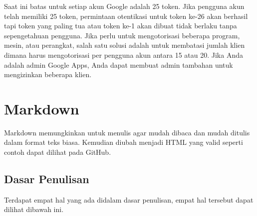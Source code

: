 Saat ini batas untuk setiap akun Google adalah 25 token. Jika pengguna akun telah memiliki 25 token, permintaan otentikasi untuk token ke-26 akan berhasil tapi token yang paling tua atau token ke-1 akan dibuat tidak berlaku tanpa sepengetahuan pengguna.
Jika perlu untuk mengotorisasi beberapa program, mesin, atau perangkat, salah satu solusi adalah untuk membatasi jumlah klien dimana harus mengotorisasi per pengguna akun antara 15 atau 20. Jika Anda adalah admin Google Apps, Anda dapat membuat admin tambahan untuk mengizinkan beberapa klien.

\section{Markdown \cite{Markdown:2015}}
\label{sec:markdown}

Markdown memungkinkan untuk menulis agar mudah dibaca dan mudah ditulis dalam format teks biasa. Kemudian diubah menjadi HTML yang valid seperti contoh dapat dilihat pada GitHub. 

\subsection{Dasar Penulisan}
Terdapat empat hal yang ada didalam dasar penulisan, empat hal tersebut dapat dilihat dibawah ini. 

